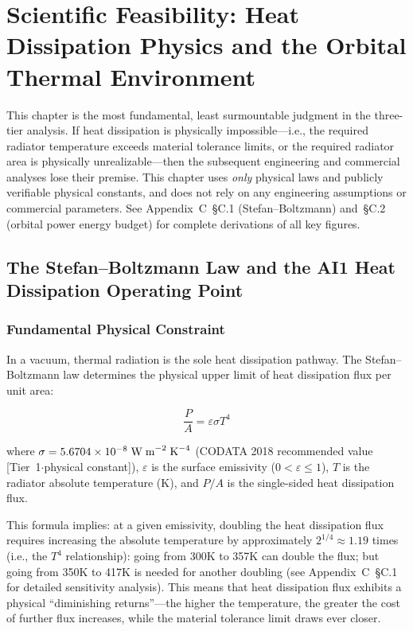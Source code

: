 
\section{Scientific Feasibility: Heat Dissipation Physics and the Orbital Thermal Environment}

This chapter is the most fundamental, least surmountable judgment in the three-tier analysis. If heat dissipation is physically impossible---i.e., the required radiator temperature exceeds material tolerance limits, or the required radiator area is physically unrealizable---then the subsequent engineering and commercial analyses lose their premise. This chapter uses \emph{only} physical laws and publicly verifiable physical constants, and does not rely on any engineering assumptions or commercial parameters. See Appendix~C~\S C.1 (Stefan--Boltzmann) and~\S C.2 (orbital power energy budget) for complete derivations of all key figures.

\subsection{The Stefan--Boltzmann Law and the AI1 Heat Dissipation Operating Point}

\subsubsection{Fundamental Physical Constraint}

In a vacuum, thermal radiation is the sole heat dissipation pathway. The Stefan--Boltzmann law determines the physical upper limit of heat dissipation flux per unit area:

\begin{equation}
\frac{P}{A} = \varepsilon \sigma T^{4}
\label{eq:sb}
\end{equation}

where $\sigma = 5.6704\times10^{-8}\;\text{W\;m}^{-2}\;\text{K}^{-4}$ (CODATA 2018 recommended value [Tier~1$\cdot$physical constant]), $\varepsilon$ is the surface emissivity ($0<\varepsilon\leq 1$), $T$ is the radiator absolute temperature (K), and $P/A$ is the single-sided heat dissipation flux.

This formula implies: at a given emissivity, doubling the heat dissipation flux requires increasing the absolute temperature by approximately $2^{1/4} \approx 1.19$ times (i.e., the $T^4$ relationship): going from 300\;K to 357\;K can double the flux; but going from 350\;K to 417\;K is needed for another doubling (see Appendix~C~\S C.1 for detailed sensitivity analysis). This means that heat dissipation flux exhibits a physical ``diminishing returns''---the higher the temperature, the greater the cost of further flux increases, while the material tolerance limit draws ever closer.

